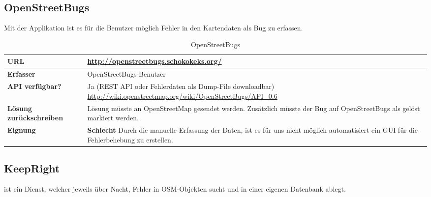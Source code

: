 \subsection{OpenStreetBugs}
Mit der Applikation  ist es für die Benutzer möglich Fehler in den Kartendaten als Bug zu erfassen.

\begin{table}[H]
\centering
\begin{tabular}{|p{0.3\twocelltabwidth}|p{0.7\twocelltabwidth}|}
\hline 
\small{\textbf{URL}} & \url{http://openstreetbugs.schokokeks.org/} \\
\hline 
\small{\textbf{Erfasser}} & OpenStreetBugs-Benutzer \\
\hline 
\small{\textbf{API verfügbar?}} & Ja (\gls{REST} \gls{API} oder Fehlerdaten als Dump-File downloadbar) \newline
\url{http://wiki.openstreetmap.org/wiki/OpenStreetBugs/API_0.6} \\
\hline 
\small{\textbf{Lösung zurückschreiben}} & Lösung müsste an \gls{OpenStreetMap} gesendet werden. Zusätzlich  müsste der Bug auf OpenStreetBugs als gelöst markiert werden. \\
\hline
\small{\textbf{Eignung}} & \textbf{Schlecht} \linebreak Durch die manuelle Erfassung der Daten, ist es für uns nicht möglich automatisiert ein GUI für die Fehlerbehebung zu erstellen. \\ 
\hline 
\end{tabular} 
\caption{OpenStreetBugs}
\label{datenquellen-openstreetbugs}
\end{table}

\subsection{KeepRight}
 ist ein Dienst, welcher jeweils über Nacht, Fehler in OSM-Objekten sucht und in einer eigenen Datenbank ablegt.

